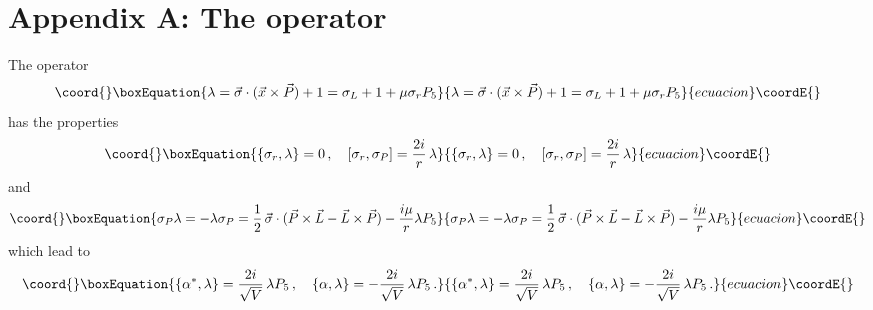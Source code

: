 \documentclass[a4paper,12pt]{article}
\begin{document}
\setcounter{equation}{0} \renewcommand{\theequation}
{A.\arabic{equation}}

\section*{Appendix A: The operator \myHighlight{$\lambda$}\coordHE{}} 

The operator
\begin{equation}\coord{}\boxEquation{\label{Alam}
\lambda=\vec{\sigma}\cdot(\vec{x}\times \vec{P})+1
=\sigma_{L}+1+\mu\sigma_{r}P_{5}
}{\lambda=\vec{\sigma}\cdot(\vec{x}\times \vec{P})+1
=\sigma_{L}+1+\mu\sigma_{r}P_{5}
}{ecuacion}\coordE{}\end{equation} 
has the properties
\begin{equation}\coord{}\boxEquation{
\{\sigma_{r},\lambda\}=0\,,\quad [\sigma_{r},\sigma_{P}]=
\frac{2i}{r}\,\lambda
}{
\{\sigma_{r},\lambda\}=0\,,\quad [\sigma_{r},\sigma_{P}]=
\frac{2i}{r}\,\lambda
}{ecuacion}\coordE{}\end{equation}
and
\begin{equation}\coord{}\boxEquation{\label{silam}
\sigma_{P}\lambda=-\lambda\sigma_{P}=
\frac{1}{2}\,\vec{\sigma}\cdot(\vec{P}\times\vec{L}-\vec{L}\times\vec{P})
-\frac{i\mu}{r}\lambda P_{5}
}{\sigma_{P}\lambda=-\lambda\sigma_{P}=
\frac{1}{2}\,\vec{\sigma}\cdot(\vec{P}\times\vec{L}-\vec{L}\times\vec{P})
-\frac{i\mu}{r}\lambda P_{5}
}{ecuacion}\coordE{}\end{equation}
which lead to 
\begin{equation}\coord{}\boxEquation{
\{\alpha^{*},\lambda\}=\frac{2i}{\sqrt{V}}\,\lambda P_{5}\,,\quad 
\{\alpha,\lambda\}=-\frac{2i}{\sqrt{V}}\,\lambda P_{5}\,. 
}{
\{\alpha^{*},\lambda\}=\frac{2i}{\sqrt{V}}\,\lambda P_{5}\,,\quad 
\{\alpha,\lambda\}=-\frac{2i}{\sqrt{V}}\,\lambda P_{5}\,. 
}{ecuacion}\coordE{}\end{equation}
\end{document}
